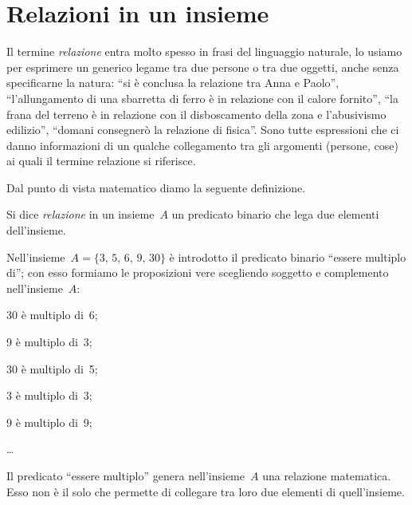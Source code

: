 \ovalbox{\risolvi \ref{ese:7.1}}

\section{Relazioni in un insieme}

Il termine \emph{relazione} entra molto spesso in frasi del linguaggio naturale, lo usiamo per esprimere un generico legame tra due persone o tra due oggetti,
anche senza specificarne la natura: ``si è conclusa la relazione tra Anna e Paolo'', ``l'allungamento di una sbarretta di ferro è in relazione con il calore fornito'',
``la frana del terreno è in relazione con il disboscamento della zona e l'abusivismo edilizio'', ``domani consegnerò la relazione di fisica''.
Sono tutte espressioni che ci danno informazioni di un qualche collegamento tra gli
argomenti (persone, cose) ai quali il termine relazione si riferisce.

Dal punto di vista matematico diamo la seguente definizione.
\begin{definizione}
Si dice \emph{relazione} in un insieme~$A$ un predicato binario che lega due elementi dell'insieme.
\end{definizione}

\begin{exrig}
 \begin{esempio}
 Nell'insieme~$A = \{3\text{,~}5\text{,~}6\text{,~}9\text{,~}30\}$ è introdotto il predicato binario ``essere multiplo di''; con esso formiamo le proposizioni vere scegliendo soggetto e
 complemento nell'insieme~$A$:

\begin{multicols}{3}
30 è multiplo di~6;

9 è multiplo di~3;



30 è multiplo di~5;

3 è multiplo di~3;



9 è multiplo di~9;

\ldots
\end{multicols}
Il predicato ``essere multiplo'' genera nell'insieme~$A$ una relazione matematica. Esso non è il
solo che permette di collegare tra loro due elementi di quell'insieme.
\end{esempio}
\end{exrig}

